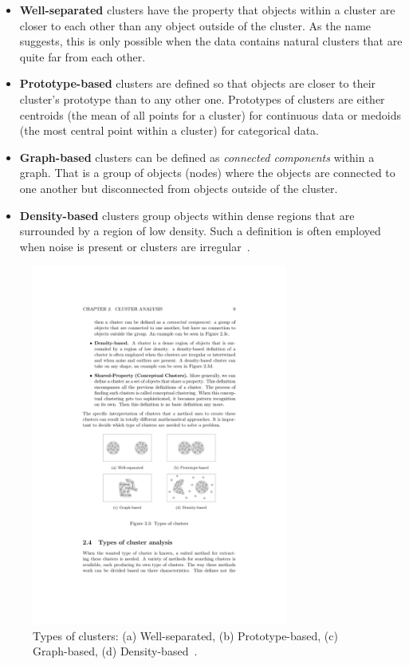 \begin{itemize}

\item \textbf{Well-separated} clusters have the property that objects within a cluster are closer to each other than any object outside of the cluster. As the name suggests, this is only possible when the data contains natural clusters that are quite far from each other.

\item \textbf{Prototype-based} clusters are defined so that objects are closer to their cluster's prototype than to any other one. Prototypes of clusters are either centroids (the mean of all points for a cluster) for continuous data or medoids (the most central point within a cluster) for categorical data.

\item \textbf{Graph-based} clusters can be defined as \emph{connected components} within a graph. That is a group of objects (nodes) where the objects are connected to one another but disconnected from objects outside of the cluster.

\item \textbf{Density-based} clusters group objects within dense regions that are surrounded by a region of low density. Such a definition is often employed when noise is present or clusters are irregular~\cite{Meert06clustermaps}.

\end{itemize}

\begin{figure}[h]
  \begin{center}
    \includegraphics[width=0.75\textwidth]{figures/cluster_types.pdf}
    \caption{Types of clusters: (a) Well-separated, (b) Prototype-based, (c) Graph-based, (d) Density-based~\cite[p 9]{Meert06clustermaps}.}
    \label{fig:clusters}
  \end{center}
\end{figure}



